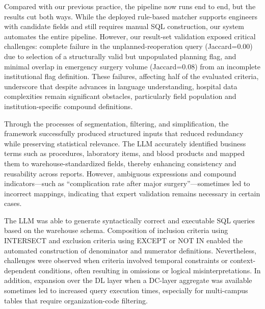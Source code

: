 \documentclass[10pt,twocolumn]{article}
\begin{document}
Compared with our previous practice, the pipeline now runs end to end, but the results cut both ways.
While the deployed rule-based matcher supports engineers with candidate fields
and still requires manual SQL construction, our system automates the entire
pipeline. However, our result-set validation exposed critical challenges:
complete failure in the unplanned-reoperation query (Jaccard=0.00) due to
selection of a structurally valid but unpopulated planning flag, and minimal
overlap in emergency surgery volume (Jaccard=0.08) from an incomplete
institutional flag definition. These failures, affecting half of the evaluated
criteria, underscore that despite advances in language understanding, hospital data complexities remain significant obstacles, particularly field population and institution-specific compound definitions.

Through the processes of segmentation, filtering, and simplification, the
framework successfully produced structured inputs that reduced redundancy while
preserving statistical relevance. The LLM accurately identified business terms
such as procedures, laboratory items, and blood products and mapped them to
warehouse-standardized fields, thereby enhancing consistency and reusability
across reports. However, ambiguous expressions and compound
indicators---such as ``complication rate after major surgery''---sometimes led
to incorrect mappings, indicating that expert validation remains necessary in
certain cases.

The LLM was able to generate syntactically correct and executable SQL queries
based on the warehouse schema. Composition of inclusion criteria using
INTERSECT and exclusion criteria using EXCEPT or NOT IN enabled the automated
construction of denominator and numerator definitions. Nevertheless, challenges
were observed when criteria involved temporal constraints or context-dependent
conditions, often resulting in omissions or logical misinterpretations. In
addition, expansion over the DL layer when a DC-layer aggregate was available
sometimes led to increased query execution times, especially for multi-campus
tables that require organization-code filtering.
\end{document}
